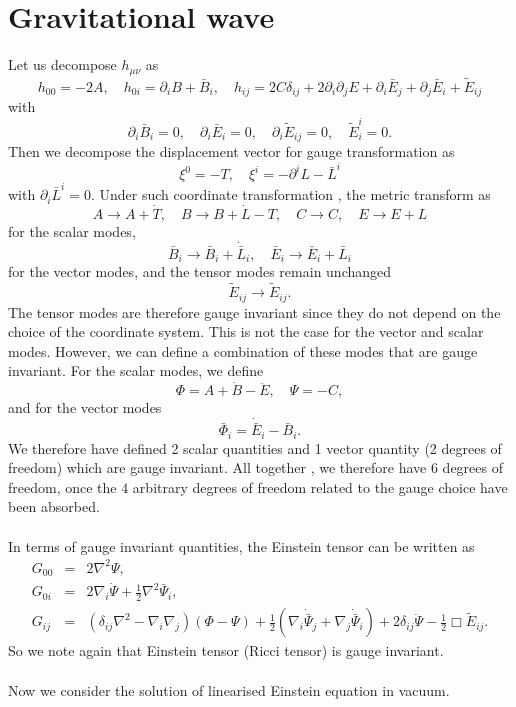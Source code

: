 \section{Gravitational wave}
Let us decompose $h_{\mu\nu}$ as
\[h_{00} = -2A , \quad h_{0i} = \partial_i B + \bar{B}_i , \quad h_{ij} = 2C\delta_{ij} + 2\partial_i\partial_j E + \partial _i\bar{E}_j + \partial_j\bar{E}_i + \tilde{E}_{ij} \]
with
\[\partial_i \bar{B}_i = 0 , \quad \partial_i \bar{E}_i = 0 , \quad \partial_i \tilde{E}_{ij} = 0 , \quad \tilde{E}^i_i = 0.\]
Then we decompose the displacement vector for gauge transformation as
\[\xi^0 = -T , \quad \xi^i = -\partial^i L - \bar{L}^i \]
with $\partial_i \bar{L}^i = 0$. 
Under such coordinate transformation , the metric transform as
\[A \to A + \dot{T} , \quad B \to B + \dot{L} - T , \quad C \to C , \quad E \to E  + L \]
for the scalar modes,
\[\bar{B}_i \to \bar{B}_i + \dot{\bar{L}}_i , \quad \bar{E}_i \to \bar{E}_i + \bar{L}_i \]
for the vector modes, and the tensor modes remain unchanged
\[\tilde{E}_{ij} \to \tilde{E}_{ij}.\]
The tensor modes are therefore gauge invariant since they do not depend on the choice of the coordinate system. This is not the case for the vector and scalar modes. 
However, we can define a combination of these modes that are gauge invariant. For the scalar modes, we define
\[\Phi = A + \dot{B} - \ddot{E} , \quad \Psi = -C, \]
and for the vector modes
\[\bar{\Phi}_i = \dot{\bar{E}}_i - \bar{B}_i.\]
We therefore have defined 2 scalar quantities and 1 vector quantity (2 degrees of freedom) which are gauge invariant. All together , we therefore have $6$ degrees of freedom, once the $4$ arbitrary degrees of freedom related to the gauge choice have been absorbed.
\\ \\
In terms of gauge invariant quantities, the Einstein tensor can be written as
\begin{eqnarray}
G_{00} &=& 2\nabla^2 \Psi, \nonumber \\
G_{0i} &=& 2\nabla_{i} \dot{\Psi} + \frac{1}{2}\nabla^2 \bar{\Psi}_{i}, \nonumber \\
G_{ij} &=& (\delta_{ij}\nabla^2-\nabla_{i} \nabla_{j})(\Phi-\Psi) + \frac{1}{2}\left( \nabla_{i} \dot{\bar{\Psi}}_{j} + \nabla_{j} \dot{\bar{\Psi}}_{i}\right) + 2\delta_{ij}\ddot{\Psi} - \frac{1}{2}\Box \tilde{E}_{ij}. \nonumber
\end{eqnarray}
So we note again that Einstein tensor (Ricci tensor) is gauge invariant.
\\ \\
Now we consider the solution of linearised Einstein equation in vacuum.
